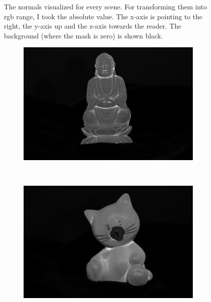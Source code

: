 \documentclass{paper}
\begin{document}
\begin{figure}[h!]
\begin{subfigure}{0.3\textwidth}
        \end{subfigure}
        \caption{The normals visualized for every scene. For transforming
         them into rgb range, I took the absolute value. The x-axis
         is pointing to the right, the y-axis up and the z-axis towards
         the reader. The background 
         (where the mask is zero) is shown black. }
        \label{fig:normals}
\end{figure}
\begin{figure}[h!]
        \centering
        \begin{subfigure}{0.3\textwidth}
                \includegraphics[width=\textwidth]{report_fig/buddha_a}
        \end{subfigure}
        ~ 
        \begin{subfigure}{0.3\textwidth}
                \includegraphics[width=\textwidth]{report_fig/cat_a}
        \end{subfigure}

\end{figure}
\end{document}
